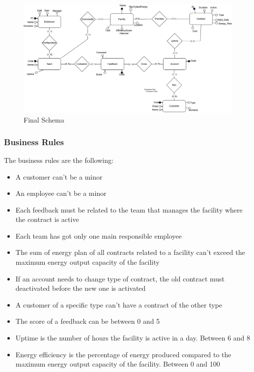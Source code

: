 \begin{figure}[H]
    \centering
    \includegraphics[width=\textwidth]{images/ER.png}
    \caption{Final Schema}
\end{figure}


\subsubsection{Business Rules}
The business rules are the following:
\begin{itemize}
    \item A customer can't be a minor
    \item An employee can't be a minor
    \item Each feedback must be related to the team that manages the facility where the contract is active
    \item Each team has got only one main responsible employee
    \item The sum of energy plan of all contracts related to a facility can't exceed the maximum energy output capacity of the facility
    \item If an account needs to change type of contract, the old contract must deactivated before the new one is activated
    \item A customer of a specific type can't have a contract of the other type
    \item The score of a feedback can be between 0 and 5
    \item Uptime is the number of hours the facility is active in a day. Between 6 and 8
    \item Energy efficiency is the percentage of energy produced compared to the maximum energy output capacity of the facility. Between 0 and 100
\end{itemize}



